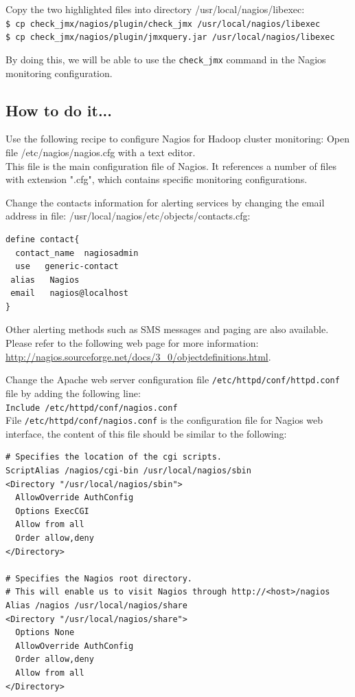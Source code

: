 
Copy the two highlighted files into directory /usr/local/nagios/libexec: \\
\verb|$ cp check_jmx/nagios/plugin/check_jmx /usr/local/nagios/libexec| \\
\verb|$ cp check_jmx/nagios/plugin/jmxquery.jar /usr/local/nagios/libexec|

By doing this, we will be able to use the \verb|check_jmx| command in the Nagios monitoring configuration.

\subsection*{How to do it...}
Use the following recipe to configure Nagios for Hadoop cluster monitoring:
Open file /etc/nagios/nagios.cfg with a text editor. \\

This file is the main configuration file of Nagios. It references a number of files with extension ".cfg", which contains specific monitoring configurations.

Change the contacts information for alerting services by changing the email address in file: /usr/local/nagios/etc/objects/contacts.cfg: 
\begin{verbatim}
define contact{
  contact_name  nagiosadmin
  use   generic-contact
 alias   Nagios
 email   nagios@localhost
}
\end{verbatim}

Other alerting methods such as SMS messages and paging are also available. Please refer to the following web page for more information: \url{http://nagios.sourceforge.net/docs/3_0/objectdefinitions.html}.

Change the Apache web server configuration file \verb|/etc/httpd/conf/httpd.conf| file by adding the following line: \\
\verb|Include /etc/httpd/conf/nagios.conf| \\
File \verb|/etc/httpd/conf/nagios.conf| is the configuration file for Nagios web interface, the content of this file should be similar to the following:

\begin{verbatim}
# Specifies the location of the cgi scripts.
ScriptAlias /nagios/cgi-bin /usr/local/nagios/sbin
<Directory "/usr/local/nagios/sbin">
  AllowOverride AuthConfig
  Options ExecCGI
  Allow from all
  Order allow,deny
</Directory>

# Specifies the Nagios root directory.
# This will enable us to visit Nagios through http://<host>/nagios
Alias /nagios /usr/local/nagios/share
<Directory "/usr/local/nagios/share">
  Options None
  AllowOverride AuthConfig
  Order allow,deny
  Allow from all
</Directory>
\end{verbatim}

